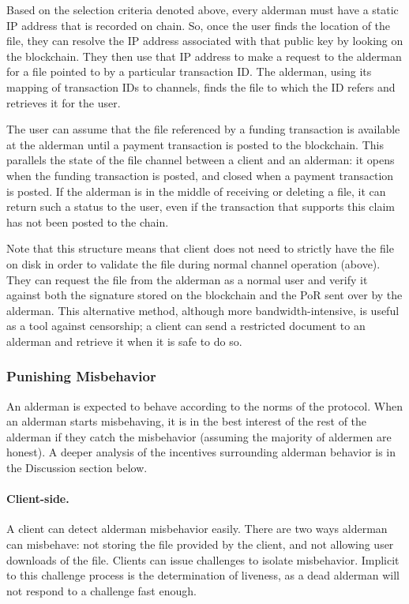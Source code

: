 \documentclass{article}
\begin{document}
Based on the selection criteria denoted above, every alderman must have a static
IP address that is recorded on chain. So, once the user finds the location of
the file, they can resolve the IP address associated with that public key by
looking on the blockchain. They then use that IP address to make a request to
the alderman for a file pointed to by a particular transaction ID. The alderman,
using its mapping of transaction IDs to channels, finds the file to which the ID
refers and retrieves it for the user.

The user can assume that the file referenced by a funding transaction is
available at the alderman until a payment transaction is posted to the
blockchain. This parallels the state of the file channel between a client and an
alderman: it opens when the funding transaction is posted, and closed when a
payment transaction is posted. If the alderman is in the middle of receiving or
deleting a file, it can return such a status to the user, even if the
transaction that supports this claim has not been posted to the chain. 

Note that this structure means that client does not need to strictly have the
file on disk in order to validate the file during normal channel operation
(above). They can request the file from the alderman as a normal user and verify
it against both the signature stored on the blockchain and the PoR sent over by
the alderman. This alternative method, although more bandwidth-intensive, is
useful as a tool against censorship; a client can send a restricted document to
an alderman and retrieve it when it is safe to do so.


\subsubsection{Punishing Misbehavior}

An alderman is expected to behave according to the norms of the protocol. When
an alderman starts misbehaving, it is in the best interest of the rest of the
alderman if they catch the misbehavior (assuming the majority of aldermen are
honest). A deeper analysis of the incentives surrounding alderman behavior is in
the Discussion section below.

\paragraph{Client-side.} A client can detect alderman misbehavior easily. There
are two ways alderman can misbehave: not storing the file provided by the client,
and not allowing user downloads of the file. Clients can issue challenges to
isolate misbehavior. Implicit to this challenge process is the determination of
liveness, as a dead alderman will not respond to a challenge fast enough.
\end{document}
